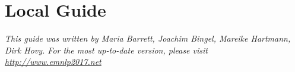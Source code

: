 \chapter{Local Guide}

\emph{This guide was written by Maria Barrett, Joachim Bingel, Mareike Hartmann, Dirk Hovy. For the most up-to-date version, please visit
  \url{http://www.emnlp2017.net}}
  


\begin{center}
\end{center}
